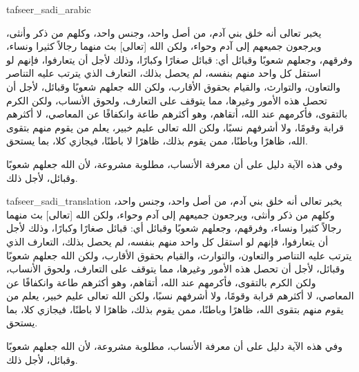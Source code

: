 \begin{taggedblock}{tafseer_sadi_arabic}
\begin{Arabic}
يخبر تعالى أنه خلق بني آدم، من أصل واحد، وجنس واحد، وكلهم من ذكر وأنثى، ويرجعون جميعهم إلى آدم وحواء، ولكن الله
[تعالى]
بث منهما رجالاً كثيرا ونساء، وفرقهم، وجعلهم شعوبًا وقبائل أي: قبائل صغارًا وكبارًا، وذلك لأجل أن يتعارفوا، فإنهم لو استقل كل واحد منهم بنفسه، لم يحصل بذلك، التعارف الذي يترتب عليه التناصر والتعاون، والتوارث، والقيام بحقوق الأقارب، ولكن الله جعلهم شعوبًا وقبائل، لأجل أن تحصل هذه الأمور وغيرها، مما يتوقف على التعارف، ولحوق الأنساب، ولكن الكرم بالتقوى، فأكرمهم عند الله، أتقاهم، وهو أكثرهم طاعة وانكفافًا عن المعاصي، لا أكثرهم قرابة وقومًا، ولا أشرفهم نسبًا، ولكن الله تعالى عليم خبير، يعلم من يقوم منهم بتقوى الله، ظاهرًا وباطنًا، ممن يقوم بذلك، ظاهرًا لا باطنًا، فيجازي كلا، بما يستحق.

وفي هذه الآية دليل على أن معرفة الأنساب، مطلوبة مشروعة، لأن الله جعلهم شعوبًا وقبائل، لأجل ذلك.
\end{Arabic}
\end{taggedblock}
\begin{taggedblock}{tafseer_sadi_translation}
يخبر تعالى أنه خلق بني آدم، من أصل واحد، وجنس واحد، وكلهم من ذكر وأنثى، ويرجعون جميعهم إلى آدم وحواء، ولكن الله
[تعالى]
بث منهما رجالاً كثيرا ونساء، وفرقهم، وجعلهم شعوبًا وقبائل أي: قبائل صغارًا وكبارًا، وذلك لأجل أن يتعارفوا، فإنهم لو استقل كل واحد منهم بنفسه، لم يحصل بذلك، التعارف الذي يترتب عليه التناصر والتعاون، والتوارث، والقيام بحقوق الأقارب، ولكن الله جعلهم شعوبًا وقبائل، لأجل أن تحصل هذه الأمور وغيرها، مما يتوقف على التعارف، ولحوق الأنساب، ولكن الكرم بالتقوى، فأكرمهم عند الله، أتقاهم، وهو أكثرهم طاعة وانكفافًا عن المعاصي، لا أكثرهم قرابة وقومًا، ولا أشرفهم نسبًا، ولكن الله تعالى عليم خبير، يعلم من يقوم منهم بتقوى الله، ظاهرًا وباطنًا، ممن يقوم بذلك، ظاهرًا لا باطنًا، فيجازي كلا، بما يستحق.

وفي هذه الآية دليل على أن معرفة الأنساب، مطلوبة مشروعة، لأن الله جعلهم شعوبًا وقبائل، لأجل ذلك.
\end{taggedblock}

\begin{comment}
Please use the following for footnotes:- Sample\footnoteQ{Text of Qur'an footnote goes here.}.
Sample\footnoteT{Text of Tafseer footnote goes here.}.
\end{comment}
